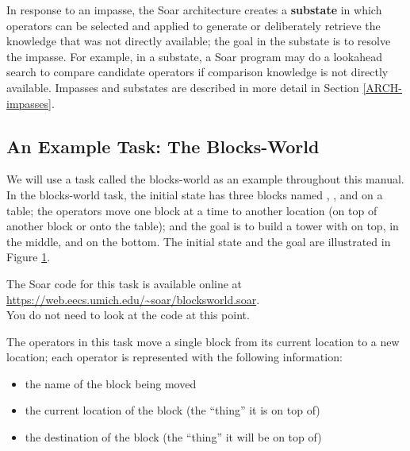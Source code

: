 In response to an impasse, the Soar architecture creates a \textbf{substate} in which operators can be selected and applied to generate or deliberately retrieve the knowledge that was not directly available; the goal in the substate is to resolve the impasse. For example, in a substate, a Soar program may do a lookahead search to compare candidate operators if comparison knowledge is not directly available.  Impasses and substates are described in more detail in Section \ref{ARCH-impasses}.


\subsection{An Example Task: The Blocks-World}

We will use a task called the blocks-world as an example throughout this manual. In the blocks-world task, the initial state has three blocks named , , and  on a table; the operators move one block at a time to another location (on top of another block or onto the table); and the goal is to build a tower with  on top,  in the middle, and  on the bottom. The initial state and the goal are illustrated in Figure \ref{fig:blocks}.

The Soar code for this task is available online at \\
\url{https://web.eecs.umich.edu/~soar/blocksworld.soar}. \\
You do not need to look at the code at this point.

\begin{figure}
	\label{fig:blocks}
\end{figure}

The operators in this task move a single block from its current location to a new location; each operator is represented with the following information: 

\vspace{-12pt}
\begin{itemize}
	\item the name of the block being moved
	\vspace{-9pt}
	\item the current location of the block (the ``thing'' it is on top of) 
	\vspace{-9pt}
	\item the destination of the block (the ``thing'' it will be on top of) 
	\vspace{-9pt}
\end{itemize}


